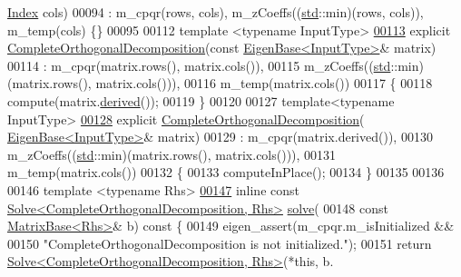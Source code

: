 \begin{DoxyCode}
      \hyperlink{namespace_eigen_a62e77e0933482dafde8fe197d9a2cfde}{Index} cols)
00094       : m\_cpqr(rows, cols), m\_zCoeffs((\hyperlink{namespacestd}{std}::min)(rows, cols)), m\_temp(cols) \{\}
00095 
00112   \textcolor{keyword}{template} <\textcolor{keyword}{typename} InputType>
\hyperlink{group___q_r___module_afcfaf7a395f853247c23bb52b1ffb1cc}{00113}   \textcolor{keyword}{explicit} \hyperlink{group___q_r___module_afcfaf7a395f853247c23bb52b1ffb1cc}{CompleteOrthogonalDecomposition}(\textcolor{keyword}{const} 
      \hyperlink{group___core___module_struct_eigen_1_1_eigen_base}{EigenBase<InputType>}& matrix)
00114       : m\_cpqr(matrix.rows(), matrix.cols()),
00115         m\_zCoeffs((\hyperlink{namespacestd}{std}::min)(matrix.rows(), matrix.cols())),
00116         m\_temp(matrix.cols())
00117   \{
00118     compute(matrix.\hyperlink{group___core___module_a324b16961a11d2ecfd2d1b7dd7946545}{derived}());
00119   \}
00120 
00127   \textcolor{keyword}{template}<\textcolor{keyword}{typename} InputType>
\hyperlink{group___q_r___module_a082295ba2aac35a8b8b9e2d46e1d7ce4}{00128}   \textcolor{keyword}{explicit} \hyperlink{group___q_r___module_a082295ba2aac35a8b8b9e2d46e1d7ce4}{CompleteOrthogonalDecomposition}(
      \hyperlink{group___core___module_struct_eigen_1_1_eigen_base}{EigenBase<InputType>}& matrix)
00129     : m\_cpqr(matrix.derived()),
00130       m\_zCoeffs((\hyperlink{namespacestd}{std}::min)(matrix.rows(), matrix.cols())),
00131       m\_temp(matrix.cols())
00132   \{
00133     computeInPlace();
00134   \}
00135 
00136 
00146   \textcolor{keyword}{template} <\textcolor{keyword}{typename} Rhs>
\hyperlink{group___q_r___module_ab303e177cc7df17e435c79dca9ef5654}{00147}   \textcolor{keyword}{inline} \textcolor{keyword}{const} \hyperlink{group___core___module_class_eigen_1_1_solve}{Solve<CompleteOrthogonalDecomposition, Rhs>} 
      \hyperlink{group___q_r___module_ab303e177cc7df17e435c79dca9ef5654}{solve}(
00148       \textcolor{keyword}{const} \hyperlink{group___core___module_class_eigen_1_1_matrix_base}{MatrixBase<Rhs>}& b)\textcolor{keyword}{ const }\{
00149     eigen\_assert(m\_cpqr.m\_isInitialized &&
00150                  \textcolor{stringliteral}{"CompleteOrthogonalDecomposition is not initialized."});
00151     \textcolor{keywordflow}{return} \hyperlink{group___core___module_class_eigen_1_1_solve}{Solve<CompleteOrthogonalDecomposition, Rhs>}(*\textcolor{keyword}{this}, b.

\end{DoxyCode}
